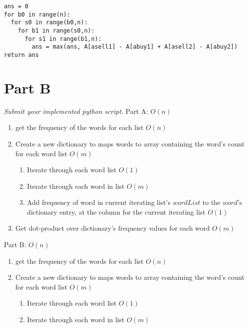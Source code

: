 \documentclass[12pt,twoside]{article}
\begin{document}
\begin{problems}
\begin{problemparts}
\begin{verbatim}
ans = 0
for b0 in range(n):
  for s0 in range(b0,n):
    for b1 in range(s0,n):
      for s1 in range(b1,n):
        ans = max(ans, A[asell1] - A[abuy1] + A[asell2] - A[abuy2])
return ans
\end{verbatim}

\problempart
\end{problemparts}

\section*{Part B}
\problem  %
\begin{problemparts}
\emph{Submit your implemented python script.}
\problempart
\problempart
\problempart
\problempart
Part A: $O(n)$
\begin{enumerate}
\item get the frequency of the words for each list $O(n)$

\item Create a new dictionary to maps words to array containing the word's count for each word list $O(m)$
  \begin{enumerate}
  \item Iterate through each word list $O(1)$

  \item Iterate through each word in list $O(m)$

  \item Add frequency of word in current iterating list's $wordList$ to the $word$'s dictionary entry, at the column for the current iterating list $O(1)$
  \end{enumerate}
  \item Get dot-product over dictionary's frequency values for each word $O(m)$
\end{enumerate}

Part B: $O(n)$
\begin{enumerate}
\item get the frequency of the words for each list $O(n)$

\item Create a new dictionary to maps words to array containing the word's count for each word list $O(m)$
  \begin{enumerate}
  \item Iterate through each word list $O(1)$

  \item Iterate through each word in list $O(m)$


\end{enumerate}
\end{enumerate}
\end{problemparts}
\end{problems}
\end{document}
